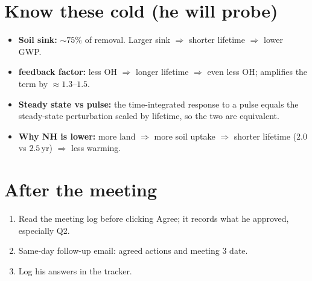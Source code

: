 \documentclass[10pt,a4paper]{article}
\begin{document}
\section{Know these cold (he will probe)}
\begin{itemize}
  \item \textbf{Soil sink:} $\sim 75\%$ of  removal. Larger sink $\Rightarrow$ shorter lifetime $\Rightarrow$ lower GWP.
  \item \textbf{ feedback factor:} less OH $\Rightarrow$ longer  lifetime $\Rightarrow$ even less OH; amplifies the  term by $\approx 1.3$--$1.5$.
  \item \textbf{Steady state vs pulse:} the time-integrated response to a pulse equals the steady-state perturbation scaled by lifetime, so the two are equivalent.
  \item \textbf{Why NH is lower:} more land $\Rightarrow$ more soil uptake $\Rightarrow$ shorter lifetime ($2.0$ vs $2.5$\,yr) $\Rightarrow$ less warming.
\end{itemize}

\section{After the meeting}
\begin{enumerate}
  \item Read the meeting log before clicking Agree; it records what he approved, especially Q2.
  \item Same-day follow-up email: agreed actions and meeting 3 date.
  \item Log his answers in the tracker.
\end{enumerate}
\end{document}
